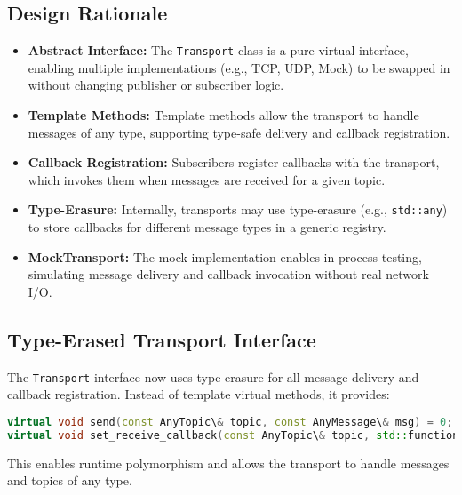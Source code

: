 \documentclass[12pt]{report}
\begin{document}
\subsection{Design Rationale}
\begin{itemize}
    \item \textbf{Abstract Interface:} The \texttt{Transport} class is a pure virtual interface, enabling multiple implementations (e.g., TCP, UDP, Mock) to be swapped in without changing publisher or subscriber logic.
    \item \textbf{Template Methods:} Template methods allow the transport to handle messages of any type, supporting type-safe delivery and callback registration.
    \item \textbf{Callback Registration:} Subscribers register callbacks with the transport, which invokes them when messages are received for a given topic.
    \item \textbf{Type-Erasure:} Internally, transports may use type-erasure (e.g., \texttt{std::any}) to store callbacks for different message types in a generic registry.
    \item \textbf{MockTransport:} The mock implementation enables in-process testing, simulating message delivery and callback invocation without real network I/O.
\end{itemize}

\subsection{Type-Erased Transport Interface}
The \texttt{Transport} interface now uses type-erasure for all message delivery and callback registration. Instead of template virtual methods, it provides:
\begin{lstlisting}[language=C++]
virtual void send(const AnyTopic\& topic, const AnyMessage\& msg) = 0;
virtual void set_receive_callback(const AnyTopic\& topic, std::function<void(const AnyMessage\&)>&& cb) = 0;
\end{lstlisting}
This enables runtime polymorphism and allows the transport to handle messages and topics of any type.
\end{document}
